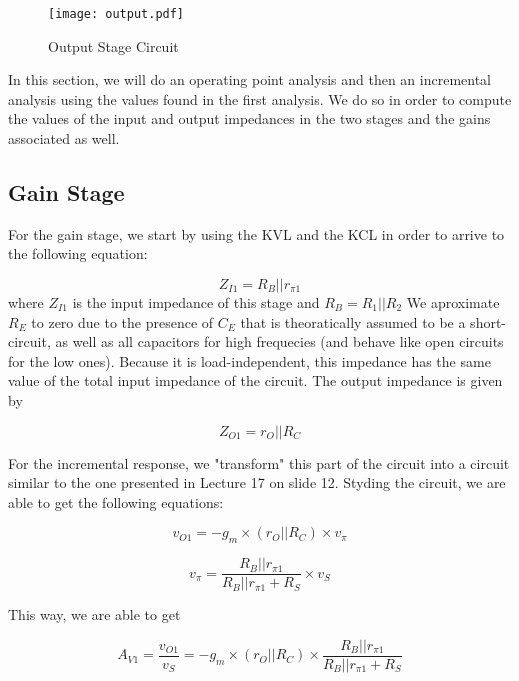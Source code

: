 \begin{figure}[H] \centering
\texttt{[image: output.pdf]}
\caption{Output Stage Circuit}
\label{fig:output}
\end{figure}


In this section, we will do an operating point analysis and then an incremental analysis using the values found in the first analysis. We do so in order to compute the values of the input and output impedances in the two stages and the gains associated as well.

\subsection{Gain Stage}

For the gain stage, we start by using the KVL and the KCL in order to arrive to the following equation:

\begin{equation}
Z_{I1} = R_B||r_{\pi1}
\label{eq:1.1}
\end{equation}
where $Z_{I1}$ is the input impedance of this stage and $R_B = R_1 || R_2$
We aproximate $R_E$ to zero due to the presence of $C_E$ that is theoratically assumed to be a short-circuit, as well as all capacitors for high frequecies (and behave like open circuits for the low ones). Because it is load-independent, this impedance has the same value of the total input impedance of the circuit.
The output impedance is given by 

\begin{equation}
Z_{O1} = r_O||R_C
\label{eq:1.2}
\end{equation}

For the incremental response, we "transform" this part of the circuit into a circuit similar to the one presented in Lecture 17 on slide 12. Styding the circuit, we are able to get the following equations:

\begin{equation}
v_{O1} = -g_m \times (r_O||R_C) \times v_\pi
\label{eq:1.3}
\end{equation}

\begin{equation}
v_\pi = \frac{R_B||r_{\pi 1}}{R_B||r_{\pi 1}+R_S} \times v_S
\label{eq:1.4}
\end{equation}

This way, we are able to get

\begin{equation}
A_{V1} = \frac{v_{O1}}{v_S} = -g_m \times (r_O||R_C) \times \frac{R_B||r_{\pi 1}}{R_B||r_{\pi 1}+R_S}
\label{eq:1.5}
\end{equation}

